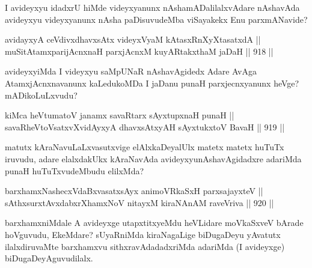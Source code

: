 \begin{artha}
I avideyxyu idadxrU hiMde videyxyanunx nAshamADalilalxvAdare nAshavAda avideyxyu videyxyanunx nAsha paDisuvudeMba viSayakekx Enu parxmANavide?
\end{artha}

\begin{shl}
avidayxyA ceVdivxdhavxsAtx videyxVyaM kAtasxRnXyXtasatxdA || \\
muSitAtamxparijAcnxnaH parxjAcnxM kuyARtakxthaM jaDaH \hfill || 918 ||  
\end{shl}

\begin{artha}
avideyxyiMda I videyxyu saMpUNaR nAshavAgidedx Adare AvAga AtamxjAcnxnavanunx kaLedukoMDa I jaDanu punaH parxjecnxyanunx heVge? mADikoLuLxvudu?
\end{artha}

\begin{shl}
kiMca heVtumatoV janamx savaRtarx sAyxtupxnaH punaH || \\
savaRheVtoVsatxvXvidAyxyA dhavxsAtxyAH sAyxtukxtoV BavaH \hfill || 919 ||  
\end{shl}

\begin{artha}
matutx kAraNavuLaLxvasutxvige elAlxkaDeyalUlx matetx matetx huTuTx iruvudu, adare elalxdakUkx kAraNavAda avideyxyunAshavAgidadxre adariMda punaH huTuTxvudeMbudu elilxMda?
\end{artha}

\begin{shl}
barxhamxNashecxVdaBxvasatxsAyx animoVRkaSxH parxsajayxteV || \\
sAthxsurxtAvxdabxrXhamxNoV nitayxM kiraNAnAM raveVriva \hfill || 920 ||  
\end{shl}

\begin{artha}
barxhamxniMdale A avideyxge utapxtitxyeMdu heVLidare moVkaSxveV bArade hoVguvudu, EkeMdare? sUyaRniMda kiraNagaLige biDugaDeyu yAvatutx ilalxdiruvaMte barxhamxvu sithxravAdadadxriMda adariMda (I avideyxge) biDugaDeyAguvudilalx.
\end{artha}





